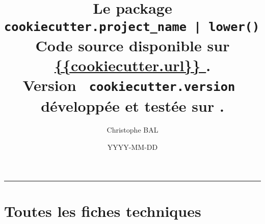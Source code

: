 \documentclass[12pt,a4paper]{book}
\begin{document}
\renewcommand\labelitemi{\raisebox{0.125em}{\tiny\textbullet}}
\renewcommand{\labelitemii}{---}

\title{   %
	Le package \texttt{ {{cookiecutter.project_name | lower()}} }\\%
	{\footnotesize Code source disponible sur \url{ {{cookiecutter.url}} }.}\\%
{\footnotesize Version \texttt{ {{cookiecutter.version}} } développée et testée sur \macosxname{}.}%
}
\author{Christophe BAL}
\date{YYYY-MM-DD}

\maketitle


\vspace{2em}

\hrule

\tableofcontents




\newpage
\chapter{Toutes les fiches techniques} \label{techincal-ids}


\end{document}
